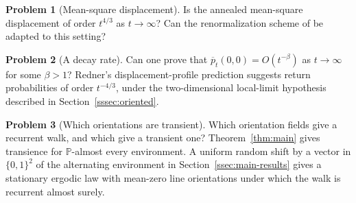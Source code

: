 \documentclass[11pt]{amsart}
\theoremstyle{plain}
\theoremstyle{definition}
\newtheorem{problem}{Problem}
\renewcommand{\P}{\mathbb P}
\newcommand{\1}{\mathbf 1}
\begin{document}
\begin{problem}[Mean-square displacement]\label{prob:powerlaw}
Is the annealed mean-square displacement of order $t^{4/3}$ as
$t\to\infty$?
Can the renormalization scheme of \citet*[Sections~1.3 and~3]{ABK26} be
adapted to this setting?
\end{problem}

\begin{problem}[A decay rate]\label{prob:pointwise}
Can one prove that $\overline p_t(0,0)=O(t^{-\beta})$ as $t\to\infty$
for some $\beta>1$?
Redner's displacement-profile prediction \citep*[(3) and p.~290]{Red89}
suggests return probabilities of order $t^{-4/3}$, under the
two-dimensional local-limit hypothesis described in
Section~\ref{sssec:oriented}.
\end{problem}



\begin{problem}[Which orientations are transient]\label{prob:which}
Which orientation fields give a recurrent walk, and which give a transient
one?  Theorem~\ref{thm:main} gives transience for $\P$-almost every
environment.  A uniform random shift by a vector in $\{0,1\}^2$ of the
alternating environment in Section~\ref{ssec:main-results} gives a stationary
ergodic law with mean-zero line orientations under which the walk is
recurrent almost surely.
\end{problem}



\end{document}
